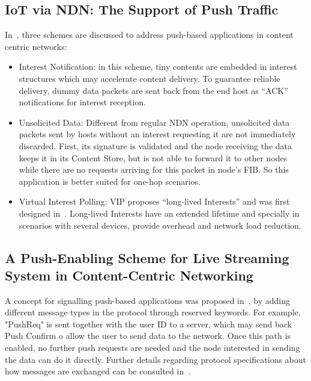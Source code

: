 \documentclass[11pt,conference]{./IEEEtran}
\begin{document}
	\subsection{IoT via NDN: The Support of Push Traffic}

	In~\cite{Amadeo14a}, three schemes are discussed to address push-based applications in content centric networks:

	\begin{itemize}

			\item Interest Notification: in this scheme, tiny contents are embedded in interest structures which may accelerate content delivery. To guarantee reliable delivery, dummy data packets are sent back from the end host as ``ACK'' notifications for interest reception. 

			\item Unsolicited Data: Different from regular NDN operation, unsolicited data packets sent by hosts without an interest requesting it are not immediately discarded. First, its signature is validated and the node receiving the data keeps it in its Content Store, but is not able to forward it to other nodes while there are no requests arriving for this packet in node's FIB. So this application is better suited for one-hop scenarios. 

			\item Virtual Interest Polling: VIP proposes ``long-lived Interests'' and was first designed in~\cite{Zhu11}. Long-lived Interests have an extended lifetime and specially in scenarios with several devices, provide overhead and network load reduction.

	\end{itemize}


	\subsection{A Push-Enabling Scheme for Live Streaming System in Content-Centric Networking}

	A concept for signalling push-based applications was proposed in~\cite{Kwangsoo13}, by adding different message types in the protocol through reserved keywords. For example, "PushReq" is sent together with the user ID to a server, which may send back Push Confirm o allow the user to send data to the network. Once this path is enabled, no further push requests are needed and the node interested in sending the data can do it directly. Further details regarding protocol specifications about how messages are exchanged can be consulted in~\cite{Kwangsoo13}.
\end{document}
